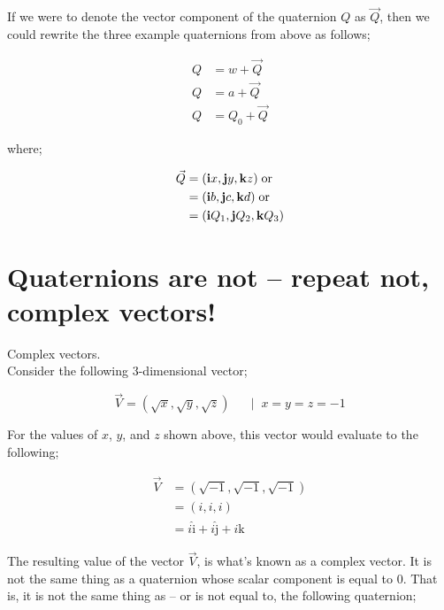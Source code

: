If we were to denote the vector component of the quaternion \(Q\) as \(\vec{Q}\), then we could rewrite the three example
quaternions from above as follows;

\begin{align*}
    Q & = w + \vec{Q}  \\
    Q & = a + \vec{Q}  \\
    Q & = Q_0 + \vec{Q}
\end{align*}
\vspace{0.0\baselineskip}

where;

\begin{align*}
    \vec{Q} &= (\bm{\mathrm{i}} x, \bm{\mathrm{j}} y, \bm{\mathrm{k}}z) \; \text{or}  \\
            &= (\bm{\mathrm{i}} b, \bm{\mathrm{j}} c, \bm{\mathrm{k}}d) \; \text{or}  \\
            &= (\bm{\mathrm{i}} Q_{1}, \bm{\mathrm{j}} Q_{2}, \bm{\mathrm{k}}Q_{3})
\end{align*}


\section{Quaternions are not -- repeat not, complex vectors!}

\textbullet \; Complex vectors. \\

Consider the following 3-dimensional vector;

\begin{equation*}
\vec{V} = (\sqrt{x}, \sqrt{y}, \sqrt{z}) \;\;\;\;\;\; | \;\; x=y=z=-1
\end{equation*}
\vspace{0.0\baselineskip}

For the values of \(x\), \(y\), and \(z\) shown above, this vector would evaluate to the following;

\begin{align*}
\vec{V} & = (\sqrt{-1}, \sqrt{-1}, \sqrt{-1})  \\
        & = (i, i, i)  \\
        & = i \bm{\hat{\mathrm{i}}} + i \bm{\hat{\mathrm{j}}} + i \bm{\hat{\mathrm{k}}}
\end{align*}
\vspace{0.0\baselineskip}

The resulting value of the vector \(\vec{V}\), is what's known as a complex vector. It is not the same thing as a
quaternion whose scalar component is equal to 0. That is, it is not the same thing as -- or is not equal to, the
following quaternion;

